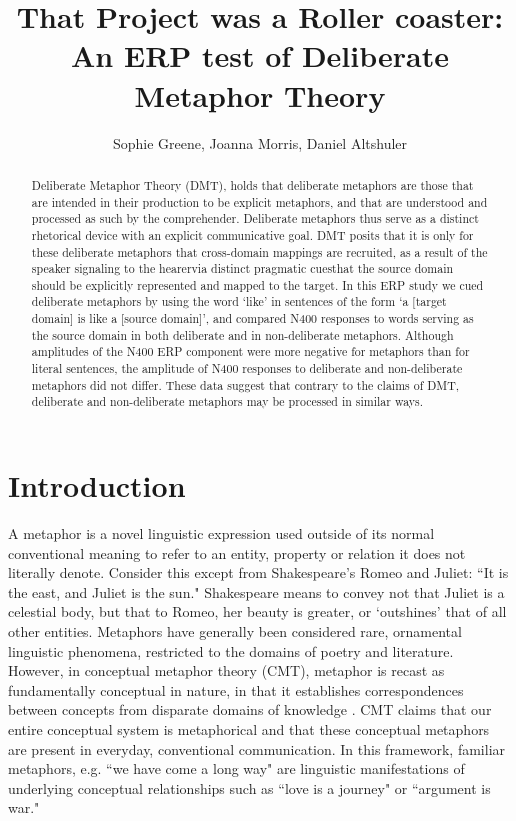 \documentclass[]{article}
\title{That Project was a Roller coaster: An ERP test of Deliberate Metaphor Theory}
\author{Sophie Greene, Joanna Morris, Daniel Altshuler}
\begin{document}
	

\maketitle

\begin{abstract}

	Deliberate Metaphor Theory (DMT), holds that deliberate metaphors are those that are intended in their production to be explicit metaphors, and that are understood and processed as such by the comprehender. Deliberate metaphors thus serve as a distinct rhetorical device with an explicit communicative goal. DMT posits that it is only for these deliberate metaphors that cross-domain mappings are recruited, as a result of the speaker signaling to the hearer\textemdash via distinct pragmatic cues\textemdash that the source domain should be explicitly represented and mapped to the target. In this ERP study we cued deliberate metaphors by using the word ‘like’ in sentences of the form ‘a [target domain] is like a [source domain]’, and compared N400 responses to words serving as the source domain in both deliberate and in non-deliberate metaphors. Although amplitudes of the N400 ERP component were more negative for metaphors than for literal sentences, the amplitude of N400 responses to deliberate and non-deliberate metaphors did not differ. These data suggest that contrary to the claims of DMT, deliberate and non-deliberate metaphors may be processed in similar ways.

\end{abstract}

\section{Introduction}

	
    A metaphor is a novel linguistic expression used outside of its normal conventional meaning to refer to an entity, property or relation it does not literally denote. Consider this except from Shakespeare's Romeo and Juliet: ``It is the east, and Juliet is the sun."  Shakespeare means to convey not that Juliet is a celestial body, but that to Romeo, her beauty is greater, or `outshines' that of all other entities.  Metaphors have generally been considered rare, ornamental linguistic phenomena, restricted to the domains of poetry and literature.  However, in conceptual metaphor theory (CMT), metaphor is recast as fundamentally conceptual in nature, in that it establishes correspondences between concepts from disparate domains of knowledge \parencite{lakoff_conceptual_1980}.  CMT claims that our entire conceptual system is metaphorical and that these conceptual metaphors are present in everyday, conventional communication. In this framework, familiar metaphors, e.g. ``we have come a long way" are linguistic manifestations of underlying conceptual relationships such as ``love is a journey" or ``argument is war." 
	
\end{document}
